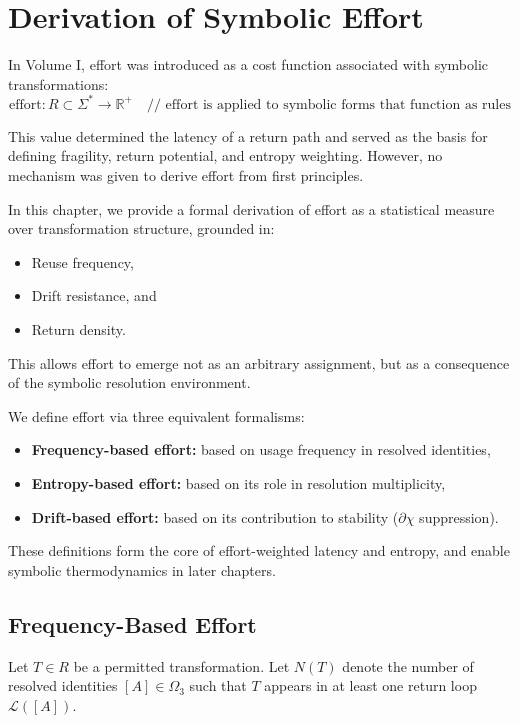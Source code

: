 \chapter{Derivation of Symbolic Effort} \label{chapter-2-derivation-of-symbolic-effort}

In Volume I, effort was introduced as a cost function associated with symbolic transformations:
\[
\text{effort} : R \subset \Sigma^* \to \mathbb{R}^+ \quad \text{// effort is applied to symbolic forms that function as rules}
\]

This value determined the latency of a return path and served as the basis for defining fragility, return potential, and entropy weighting. However, no mechanism was given to derive effort from first principles.

\medskip

In this chapter, we provide a formal derivation of effort as a statistical measure over transformation structure, grounded in:
\begin{itemize}
    \item Reuse frequency,
    \item Drift resistance, and
    \item Return density.
\end{itemize}

This allows effort to emerge not as an arbitrary assignment, but as a consequence of the symbolic resolution environment.

\medskip

We define effort via three equivalent formalisms:
\begin{itemize}
    \item \textbf{Frequency-based effort:} based on usage frequency in resolved identities,
    \item \textbf{Entropy-based effort:} based on its role in resolution multiplicity,
    \item \textbf{Drift-based effort:} based on its contribution to stability ($\partial\chi$ suppression).
\end{itemize}

These definitions form the core of effort-weighted latency and entropy, and enable symbolic thermodynamics in later chapters.

\section{Frequency-Based Effort} \label{frequency-based-effort}

Let $T \in R$ be a permitted transformation. Let $N(T)$ denote the number of resolved identities $[A] \in \Omega_3$ such that $T$ appears in at least one return loop $\mathcal{L}([A])$.

